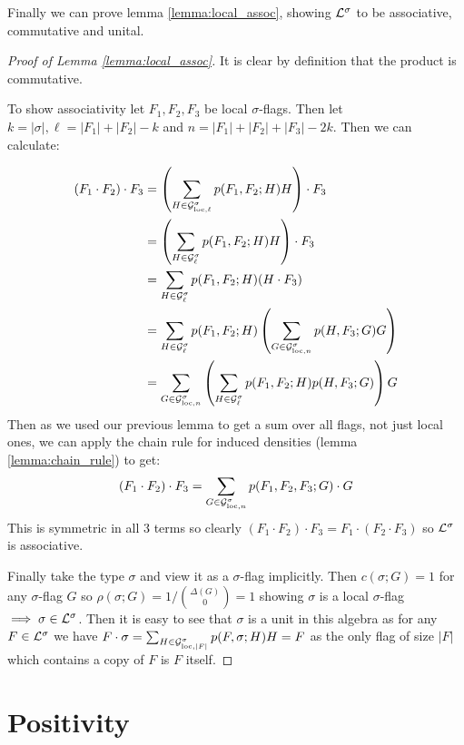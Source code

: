 Finally we can prove lemma \ref{lemma:local_assoc}, showing $\mathcal{L}^\sigma$ to be associative,
commutative and unital.

\begin{proof}[Proof of Lemma \ref{lemma:local_assoc}]
    It is clear by definition that the product is commutative.

    To show associativity let $F_1, F_2, F_3$ be local $\sigma$-flags.
    Then let $k = |\sigma|, \ell = |F_1|+|F_2|-k$ and $n = |F_1|+|F_2|+|F_3|-2k$. Then
    we can calculate:

    \[
        \begin{split}
            (F_1 \cdot F_2) \cdot F_3
            &= \left(\sum_{H\in\mathcal{G}_{\mathrm{loc},\ell}^\sigma} p(F_1,F_2;H)H\right) \cdot F_3\\
            &= \left(\sum_{H\in\mathcal{G}_\ell^\sigma} p(F_1,F_2;H)H\right) \cdot F_3\\
            &= \sum_{H\in\mathcal{G}_\ell^\sigma} p(F_1,F_2;H)(H \cdot F_3)\\
            &= \sum_{H\in\mathcal{G}_\ell^\sigma} p(F_1,F_2;H)
                \left(\sum_{G\in\mathcal{G}_{\mathrm{loc},n}^\sigma} p(H,F_3;G)G \right)\\
            &= \sum_{G\in\mathcal{G}_{\mathrm{loc},n}^\sigma}
                \left(\sum_{H\in\mathcal{G}_\ell^\sigma} p(F_1,F_2;H) p(H,F_3;G) \right) G
        \end{split}
    \]
    Then as we used our previous lemma to get a sum over all flags, not just local ones, we can
    apply the chain rule for induced densities (lemma \ref{lemma:chain_rule})
    to get:
    \[
            (F_1 \cdot F_2) \cdot F_3
            = \sum_{G\in\mathcal{G}_{\mathrm{loc},n}^\sigma} p(F_1, F_2, F_3; G)\cdot G
    \]
    This is symmetric in all 3 terms so clearly $(F_1\cdot F_2)\cdot F_3 = F_1 \cdot (F_2\cdot F_3)$
    so $\mathcal{L}^\sigma$ is associative.

    Finally take the type $\sigma$ and view it as a $\sigma$-flag implicitly. Then
    $c(\sigma; G)=1$ for any $\sigma$-flag $G$ so $\rho(\sigma; G)=1/\binom{\Delta(G)}{0}=1$
    showing $\sigma$ is a local $\sigma$-flag $\implies \sigma\in\mathcal{L}^\sigma$.
    Then it is easy to see that $\sigma$ is a unit in this algebra as for any
    $F\in\mathcal{L}^\sigma$ we have
    $F\cdot\sigma = \sum_{H \in \mathcal{G}_{\mathrm{loc},|F|}^\sigma}p(F,\sigma; H)H=F$
    as the only flag of size $|F|$ which contains a copy of $F$ is $F$ itself.
\end{proof}

\section{Positivity}

